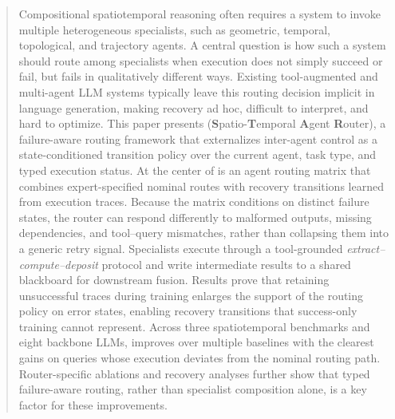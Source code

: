 \begin{abstract}
Compositional spatiotemporal reasoning often requires a system to invoke multiple heterogeneous specialists, such as geometric, temporal, topological, and trajectory agents.
A central question is how such a system should route among specialists when execution does not simply succeed or fail, but fails in qualitatively different ways.
Existing tool-augmented and multi-agent LLM systems typically leave this routing decision implicit in language generation, making recovery ad hoc, difficult to interpret, and hard to optimize. This paper presents \starname{} (\textbf{S}patio-\textbf{T}emporal \textbf{A}gent \textbf{R}outer), a failure-aware routing framework that externalizes inter-agent control as a state-conditioned transition policy over the current agent, task type, and typed execution status.
At the center of \starname{} is an agent routing matrix that combines expert-specified nominal routes with recovery transitions learned from execution traces.
Because the matrix conditions on distinct failure states, the router can respond differently to malformed outputs, missing dependencies, and tool--query mismatches, rather than collapsing them into a generic retry signal.
Specialists execute through a tool-grounded \emph{extract--compute--deposit} protocol and write intermediate results to a shared blackboard for downstream fusion. Results prove that retaining unsuccessful traces during training enlarges the support of the routing policy on error states, enabling recovery transitions that success-only training cannot represent.
Across three spatiotemporal benchmarks and eight backbone LLMs, \starname{} improves over multiple baselines with the clearest gains on queries whose execution deviates from the nominal routing path.
Router-specific ablations and recovery analyses further show that typed failure-aware routing, rather than specialist composition alone, is a key factor for these improvements.
\end{abstract}